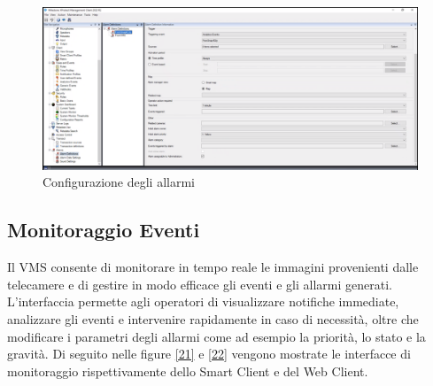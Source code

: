 \documentclass[a4paper, openright, thesis]{report}
\begin{document}
\begin{figure}[H]
    \centering
    \includegraphics[width=1\textwidth]{img/alarm_def.png}
    \caption{Configurazione degli allarmi}
    \label{20}
\end{figure}

\subsection{Monitoraggio Eventi}

Il VMS consente di monitorare in tempo reale le immagini provenienti dalle telecamere e di gestire in modo efficace gli eventi e gli allarmi generati. L'interfaccia permette agli operatori di visualizzare notifiche immediate, analizzare gli eventi e intervenire rapidamente in caso di necessità, oltre che modificare i parametri degli allarmi come ad esempio la priorità, lo stato e la gravità. 
Di seguito nelle figure \ref{21} e \ref{22} vengono mostrate le interfacce di monitoraggio rispettivamente dello Smart Client e del Web Client.
\end{document}
